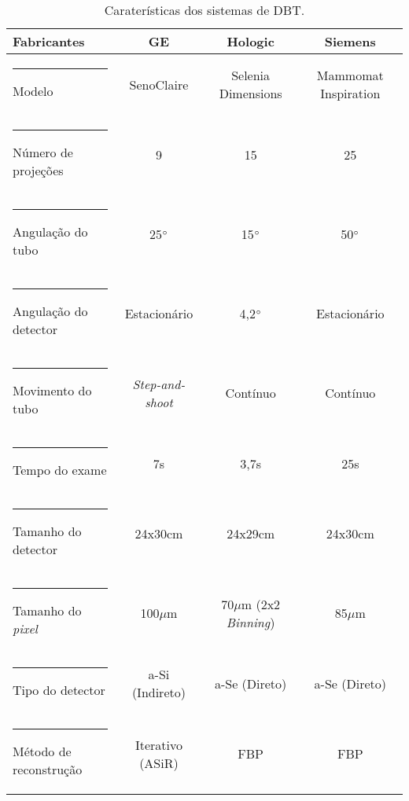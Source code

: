 \begin{table}[h]
	\centering
	\caption{Caraterísticas dos sistemas  de \acs{DBT}.}
	\label{tab:tabCap2SistemasDBT}
	\footnotesize
	\begin{tabular}{l|c|c|c}
		\textbf{Fabricantes}                                       &        \textbf{\acs{GE}}        &                 \textbf{Hologic}                 &   \textbf{Siemens}   \\
		[5pt]
		\hline
		\hline
		\rule[-0.5ex]{-3pt}{3ex}
		Modelo &    SenoClaire{\footnotesize\texttrademark}    & Selenia\textsuperscript{\textregistered} Dimensions\textsuperscript{\textregistered} & Mammomat Inspiration \\ \hline
		\rule[-0.5ex]{-3pt}{3ex}
		Número de projeções              &                9                &                        15                        &          25          \\ \hline
		\rule[-0.5ex]{-3pt}{3ex}
		Angulação do tubo                &           25$\degree$           &                   15$\degree$                    &     50$\degree$      \\ \hline
		\rule[-0.5ex]{-3pt}{3ex}
		Angulação do detector            &          Estacionário           &                   4,2$\degree$                   &     Estacionário     \\ \hline
		\rule[-0.5ex]{-3pt}{3ex}
		Movimento do tubo                &     \textit{Step-and-shoot}     &                     Contínuo                     &       Contínuo       \\ \hline
		\rule[-0.5ex]{-3pt}{3ex}
		Tempo do exame                   &               7s                &                       3,7s                       &         25s          \\ \hline
		\rule[-0.5ex]{-3pt}{3ex}
		Tamanho do detector              &             24x30cm             &                     24x29cm                      &       24x30cm        \\ \hline
		\rule[-0.5ex]{-3pt}{3ex}
		Tamanho do \textit{pixel}        &            100$\mu$m            &         70$\mu$m (2x2 \textit{Binning})          &       85$\mu$m       \\ \hline
		\rule[-0.5ex]{-3pt}{3ex}
		Tipo do detector                 &         \acs{a-Si} (Indireto)         &                  \acs{a-Se} (Direto)                   &    \acs{a-Se} (Direto)     \\ \hline
		\rule[-0.5ex]{-3pt}{3ex}
		Método de reconstrução           & Iterativo (ASiR\textsuperscript{\textregistered}) &                    \acs{FBP}                     &      \acs{FBP}       \\ \hline
	\end{tabular}
	\vspace{2ex}
\end{table}

